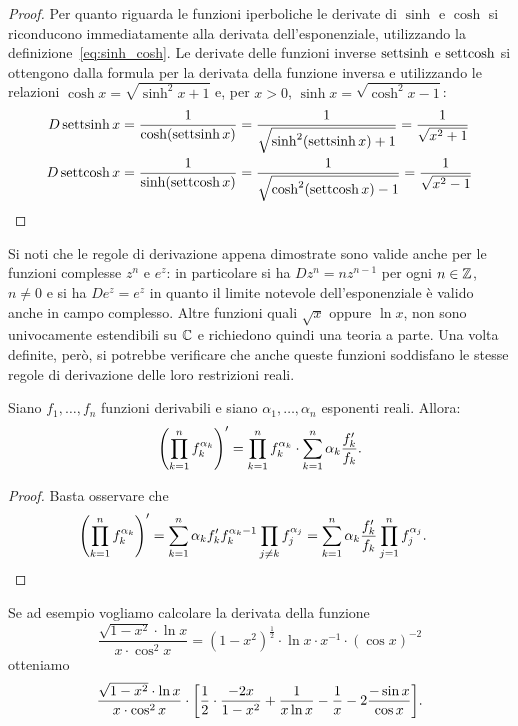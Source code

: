 \begin{proof}
Per quanto riguarda le funzioni iperboliche le derivate di $\sinh$
e $\cosh$ si riconducono immediatamente alla derivata dell'esponenziale,
utilizzando
la definizione~\eqref{eq:sinh_cosh}. Le derivate delle funzioni
inverse $\operatorname{settsinh}$ e $\operatorname{settcosh}$ si ottengono dalla formula per la derivata
della funzione inversa e utilizzando
le relazioni $\cosh x = \sqrt{\sinh^2 x+1}$ e, per $x > 0$,
$\sinh x = \sqrt{\cosh^2 x -1}$:
\begin{align*}
  D \operatorname{settsinh} x &= \frac{1}{\cosh(\operatorname{settsinh} x)}
  = \frac{1}{\sqrt{\sinh^2 (\operatorname{settsinh} x) + 1}} = \frac{1}{\sqrt{x^2+1}}\\
  D \operatorname{settcosh} x &= \frac{1}{\sinh(\operatorname{settcosh} x)}
  = \frac{1}{\sqrt{\cosh^2(\operatorname{settcosh} x)-1}}
  = \frac{1}{\sqrt{x^2-1}}
\end{align*}
\end{proof}

Si noti che le regole di derivazione appena dimostrate 
sono valide anche per le funzioni complesse $z^n$ e $e^z$:
in particolare si ha $D z^n = nz^{n-1}$ per ogni $n\in {\mathbb Z}$,
$n\neq 0$ e si ha $D e^z = e^z$ in quanto il limite 
notevole dell'esponenziale è valido anche in campo complesso.
Altre funzioni quali $\sqrt{x}$ 
oppure $\ln x$, non sono univocamente estendibili su ${\mathbb C}$
e richiedono quindi una teoria a parte. 
Una volta definite, però, si potrebbe verificare 
che anche queste funzioni soddisfano le stesse regole di derivazione 
delle loro restrizioni reali.

\begin{proposition}
Siano $f_1,\dots, f_n$ funzioni derivabili e siano $\alpha_1,\dots, \alpha_n$ 
esponenti reali. Allora:
  \[
  {\left( \prod_{k=1}^n f_k^{\alpha_k} \right)}'
  = \prod_{k=1}^n f_k^{\alpha_k} \cdot \sum_{k=1}^n \alpha_k \frac{f_k'}{f_k}.
  \]
\end{proposition}
\begin{proof}
Basta osservare che 
\begin{align*}
  {\left( \prod_{k=1}^n f_k^{\alpha_k} \right)}'
  &= \sum_{k=1}^n \alpha_k f_k' f_k^{\alpha_k-1} \prod_{j\neq k} f_j^{\alpha_j}
  = \sum_{k=1}^n \alpha_k \frac{f_k'}{f_k} \prod_{j=1}^n f_j^{\alpha_j}.
\end{align*}
\end{proof}
Se ad esempio vogliamo calcolare la derivata della funzione 
\[
 \frac{\sqrt{1-x^2}\cdot \ln x}{x\cdot \cos^2 x}
 = (1-x^2)^{\frac 1 2} \cdot \ln x \cdot x^{-1}\cdot (\cos x)^{-2}
\]
otteniamo 
\[
  \frac{\sqrt{1-x^2}\cdot \ln x}{x\cdot \cos^2 x}
  \cdot {\left[ \frac 1 2 \cdot \frac{-2x}{1-x^2} + \frac{1}{x\ln x} - \frac{1}{x}-2\frac{-\sin x}{\cos x} \right]}.
\]


